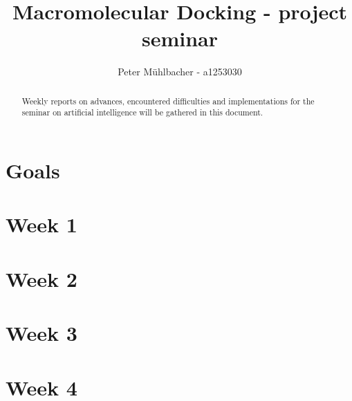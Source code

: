 \documentclass[12pt]{article}
\title{Macromolecular Docking - project seminar}
\author{Peter M\"uhlbacher - a1253030}
\theoremstyle{definition}\newtheorem*{definition}{Definition}
\theoremstyle{definition}\newtheorem*{remark}{Remark}
\begin{document}
\maketitle
\tableofcontents

\begin{abstract}
Weekly reports on advances, encountered difficulties and implementations for the seminar on artificial intelligence will be gathered in this document.
\end{abstract}

\section*{Goals}


\section{Week 1}


\section{Week 2}


\section{Week 3}


\section{Week 4}




\end{document}
